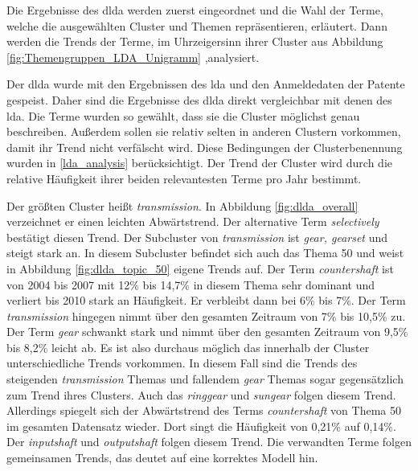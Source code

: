 Die Ergebnisse des \gls{dlda} werden zuerst eingeordnet und die Wahl der Terme, welche die ausgewählten Cluster und Themen repräsentieren, erläutert. Dann werden die Trends der Terme, im Uhrzeigersinn ihrer Cluster aus Abbildung \ref{fig:Themengruppen_LDA_Unigramm} ,analysiert.


Der \gls{dlda} wurde mit den Ergebnissen des \gls{lda} und den Anmeldedaten der Patente gespeist. Daher sind die Ergebnisse des \gls{dlda} direkt vergleichbar mit denen des \gls{lda}. Die Terme wurden so gewählt, dass sie die Cluster möglichst genau beschreiben. Außerdem sollen sie relativ selten in anderen Clustern vorkommen, damit ihr Trend nicht verfälscht wird. Diese Bedingungen der Clusterbenennung wurden in \ref{lda_analysis} berücksichtigt. Der Trend der Cluster wird durch die relative Häufigkeit ihrer beiden relevantesten Terme pro Jahr bestimmt.


Der größten Cluster heißt \emph{transmission}. In Abbildung \ref{fig:dlda_overall} verzeichnet er einen leichten Abwärtstrend. Der alternative Term \emph{selectively} bestätigt diesen Trend. Der Subcluster von \emph{transmission} ist \emph{gear, gearset} und steigt stark an. In diesem Subcluster befindet sich auch das Thema 50 und weist in Abbildung \ref{fig:dlda_topic_50} eigene Trends auf. Der Term \emph{countershaft} ist von 2004 bis 2007 mit 12\% bis 14,7\% in diesem Thema sehr dominant und verliert bis 2010 stark an Häufigkeit. Er verbleibt dann bei 6\% bis 7\%. Der Term \emph{transmission} hingegen nimmt über den gesamten Zeitraum von 7\% bis 10,5\% zu. Der Term \emph{gear} schwankt stark und nimmt über den gesamten Zeitraum von 9,5\% bis 8,2\% leicht ab. Es ist also durchaus möglich das innerhalb der Cluster unterschiedliche Trends vorkommen. In diesem Fall sind die Trends des steigenden \emph{transmission} Themas und fallendem \emph{gear} Themas sogar gegensätzlich zum Trend ihres Clusters. Auch das \emph{ringgear} und \emph{sungear} folgen diesem Trend. Allerdings spiegelt sich der Abwärtstrend des Terms \emph{countershaft} von Thema 50 im gesamten Datensatz wieder. Dort singt die Häufigkeit von 0,21\% auf 0,14\%. Der \emph{inputshaft} und \emph{outputshaft} folgen diesem Trend. Die verwandten Terme folgen gemeinsamen Trends, das deutet auf eine korrektes Modell hin.

